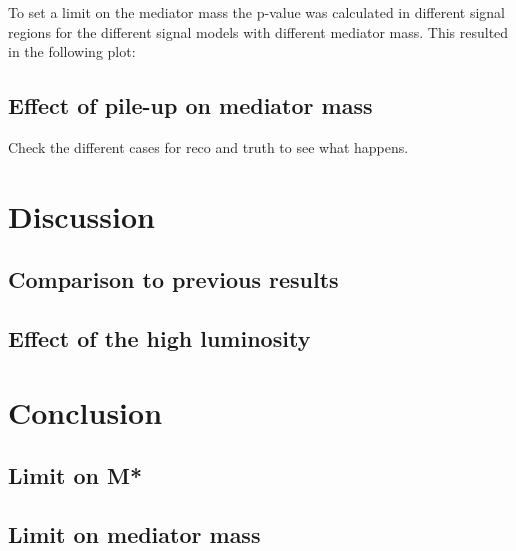 To set a limit on the mediator mass the p-value was calculated in different signal regions for the different signal models with different mediator mass. This resulted in the following plot:


\subsection{Effect of pile-up on mediator mass}
Check the different cases for reco and truth to see what happens.
\newpage
\section{Discussion}
\subsection{Comparison to previous results}
\subsection{Effect of the high luminosity}
\newpage
\section{Conclusion}
\subsection{Limit on M*}
\subsection{Limit on mediator mass}